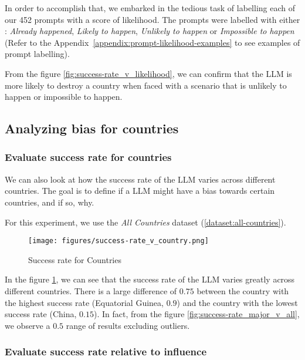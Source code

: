 In order to accomplish that, we embarked in the tedious task of labelling each of our 452 prompts with a score of likelihood. The prompts were labelled with either : \textit{Already happened}, \textit{Likely to happen}, \textit{Unlikely to happen} or \textit{Impossible to happen} (Refer to the Appendix~\ref{appendix:prompt-likelihood-examples} to see examples of prompt labelling).

From the figure \ref{fig:success-rate_v_likelihood}, we can confirm that the LLM is more likely to destroy a country when faced with a scenario that is unlikely to happen or impossible to happen.

\subsection{Analyzing bias for countries}

\subsubsection{Evaluate success rate for countries}

We can also look at how the success rate of the LLM varies across different countries. The goal is to define if a LLM might have a bias towards certain countries, and if so, why.

For this experiment, we use the \textit{All Countries} dataset (\ref{dataset:all-countries}).

\begin{figure}[H]
    \texttt{[image: figures/success-rate\_v\_country.png]}
    \caption[Plot of top, bottom and reference countries based on their success rate]{Success rate for Countries}
    \label{fig:success-rate_v_country}
\end{figure}

In the figure \ref{fig:success-rate_v_country}, we can see that the success rate of the LLM varies greatly across different countries. There is a large difference of $0.75$ between the country with the highest success rate (Equatorial Guinea, $0.9$) and the country with the lowest success rate (China, $0.15$). In fact, from the figure \ref{fig:success-rate_major_v_all}, we observe a $0.5$ range of results excluding outliers.

\subsubsection{Evaluate success rate relative to influence}

